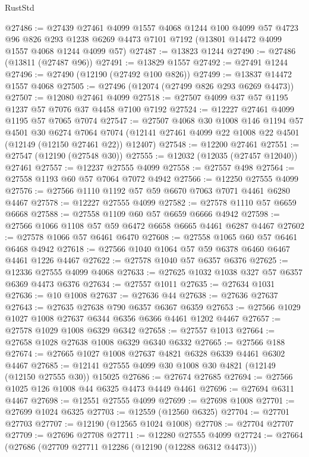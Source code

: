 \begin{lexlean}{RustStd}
\begin{coremodule}
@27486 := @27439
    @27461
    @4099
    @1557
    @4068
    @1244
    @100
    @4099
    @57
    @4723
    @96
    @826
    @293
    @1238
    @6269
    @4473
    @7101
    @7192
    (@13801 @14472 @4099 @1557 @4068 @1244 @4099 @57)
@27487 := @13823 @1244
@27490 := @27486 (@13811 (@27487 @96))
@27491 := @13829 @1557
@27492 := @27491 @1244
@27496 := @27490 (@12190 (@27492 @100 @826))
@27499 := @13837 @14472 @1557 @4068
@27505 := @27496 (@12074 (@27499 @826 @293 @6269 @4473))
@27507 := @12080 @27461 @4099
@27518 := @27507 @4099 @37 @57 @1195 @1237 @57 @7076 @37 @4458 @7100 @7192
@27524 := @12227 @27461 @4099 @1195 @57 @7065 @7074
@27547 := @27507
    @4068
    @30
    @1008
    @146
    @1194
    @57
    @4501
    @30
    @6274
    @7064
    @7074
    (@12141 @27461 @4099 @22 @1008 @22 @4501 (@12149 (@12150 @27461 @22)) @12407)
@27548 := @12200 @27461
@27551 := @27547 (@12190 (@27548 @30))
@27555 := @12032 (@12035 (@27457 @12040)) @27461
@27557 := @12237 @27555 @4099
@27558 := @27557 @498
@27564 := @27558 @1193 @60 @57 @7064 @7072 @4942
@27566 := @12250 @27555 @4099
@27576 := @27566 @1110 @1192 @57 @59 @6670 @7063 @7071 @4461 @6280 @4467
@27578 := @12227 @27555 @4099
@27582 := @27578 @1110 @57 @6659 @6668
@27588 := @27558 @1109 @60 @57 @6659 @6666 @4942
@27598 := @27566 @1066 @1108 @57 @59 @6472 @6658 @6665 @4461 @6287 @4467
@27602 := @27578 @1066 @57 @6461 @6470
@27608 := @27558 @1065 @60 @57 @6461 @6468 @4942
@27618 := @27566 @1040 @1064 @57 @59 @6378 @6460 @6467 @4461 @1226 @4467
@27622 := @27578 @1040 @57 @6357 @6376
@27625 := @12336 @27555 @4099 @4068
@27633 := @27625 @1032 @1038 @327 @57 @6357 @6369 @4473 @6376
@27634 := @27557 @1011
@27635 := @27634 @1031
@27636 := @10 @1008
@27637 := @27636 @44
@27638 := @27636 @27637
@27643 := @27635 @27638 @790 @6357 @6367 @6359
@27653 := @27566 @1029 @1027 @1008 @27637 @6344 @6356 @6366 @4461 @1202 @4467
@27657 := @27578 @1029 @1008 @6329 @6342
@27658 := @27557 @1013
@27664 := @27658 @1028 @27638 @1008 @6329 @6340 @6332
@27665 := @27566 @188
@27674 := @27665 @1027 @1008 @27637 @4821 @6328 @6339 @4461 @6302 @4467
@27685 := @12141 @27555 @4099 @30 @1008 @30 @4821 (@12149 (@12150 @27555 @30)) @15025
@27686 := @27674 @27685
@27694 := @27566 @1025 @126 @1008 @44 @6325 @4473 @4449 @4461
@27696 := @27694 @6311 @4467
@27698 := @12551 @27555 @4099
@27699 := @27698 @1008
@27701 := @27699 @1024 @6325
@27703 := @12559 (@12560 @6325)
@27704 := @27701 @27703
@27707 := @12190 (@12565 @1024 @1008)
@27708 := @27704 @27707
@27709 := @27696 @27708
@27711 := @12280 @27555 @4099
@27724 := @27664
    (@27686
      (@27709 @27711 @12286 (@12190 (@12288 @6312 @4473)))

\end{coremodule}
\end{lexlean}
